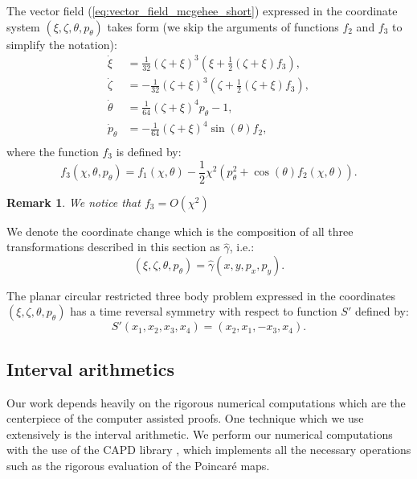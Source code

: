 \documentclass[1p]{article}
\newtheorem{remark}{Remark}
\begin{document}
The vector field (\ref{eq:vector_field_mcgehee_short}) expressed in the coordinate system $(\xi, \zeta, \theta, p_\theta)$ takes form (we skip the arguments of functions  $f_2$ and $f_3$ to simplify the notation):
\begin{equation}
    \label{eq:vector_field_aligned}
    \begin{split}
        \dot{\xi} &= \frac{1}{32} (\zeta + \xi)^3 \left( \xi + \frac{1}{2} (\zeta + \xi) {f_3} \right), \\
        \dot{\zeta} &= -\frac{1}{32} (\zeta + \xi)^3 \left( \zeta + \frac{1}{2} (\zeta + \xi) {f_3} \right), \\
        \dot{\theta} &= \frac{1}{64} (\zeta + \xi)^4 p_\theta - 1, \\
        \dot{p}_\theta &= - \frac{1}{64} (\zeta + \xi)^4 \sin(\theta) f_2, \\
    \end{split}
\end{equation}
where the function $f_3$ is defined by:
\begin{equation}
    f_3 (\chi, \theta, p_\theta) = f_1(\chi, \theta) - \frac{1}{2} \chi^2 \left( p_\theta^2 + \cos(\theta) f_2(\chi, \theta) \right).
\end{equation}
\begin{remark}
    We notice that $f_3 = O (\chi^2)$ 
\end{remark}

We denote the coordinate change which is the composition of all three transformations described in this section as $\hat{\gamma}$, i.e.:
\begin{equation}
    \label{eq:hat_gamma}
    (\xi, \zeta, \theta, p_\theta) = \hat{\gamma} (x,y,p_x,p_y).
\end{equation}

The planar circular restricted three body problem expressed in the coordinates $(\xi, \zeta, \theta, p_\theta)$ has a time reversal symmetry with respect to function $S'$ defined by:
\begin{equation}
    \label{eq:Sp_symmetry}
    S'(x_1, x_2, x_3, x_4) = (x_2, x_1, -x_3, x_4).
\end{equation}

\subsection{Interval arithmetics}

Our work depends heavily on the rigorous numerical computations which are the centerpiece of the computer assisted proofs. One technique which we use extensively is the interval arithmetic. We perform our numerical computations with the use of the CAPD library \cite{MR4283203,MR4395996}, which implements all the necessary operations such as the rigorous evaluation of the Poincar\'e maps.
\end{document}
